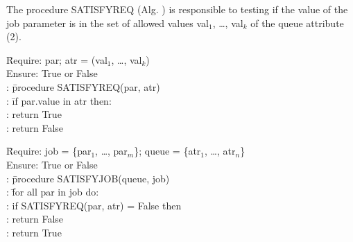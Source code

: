 The procedure SATISFY{\textunderscore}REQ (Alg. ) is responsible to testing
if the value of the job parameter is in the set of allowed values val$_1$,
\ldots, val$_k$ of the queue attribute (2).





\begin{tabbing}
\hspace{0.5in}\=
     Require: par; atr = (val$_1$, \ldots, val$_k$) \\
  \> Ensure: True or False \\
  : \hspace{1em}\= procedure SATISFY{\textunderscore}REQ(par, atr) \\
  :             \> \hspace{1em}\= if par.value in atr then: \\
  :             \>             \> return True \\
  :             \>             \> \hspace{0.1in} return False
\end{tabbing}

\begin{tabbing}
\hspace{0.5in}\=
     Require: job = \{par$_1$, \ldots, par$_m$\}; queue = \{atr$_1$, \ldots, atr$_n$\} \\
  \> Ensure: True or False \\
  : \hspace{1em}\= procedure SATISFY{\textunderscore}JOB(queue, job) \\
  :             \> \hspace{1em}\= for all par in job do: \\
  :             \>             \> if SATISFY{\textunderscore}REQ(par, atr)%
= False then \\
  :             \>             \> \hspace{2em} return False \\
  :             \>             \> \hspace{1em} return True
\end{tabbing}

